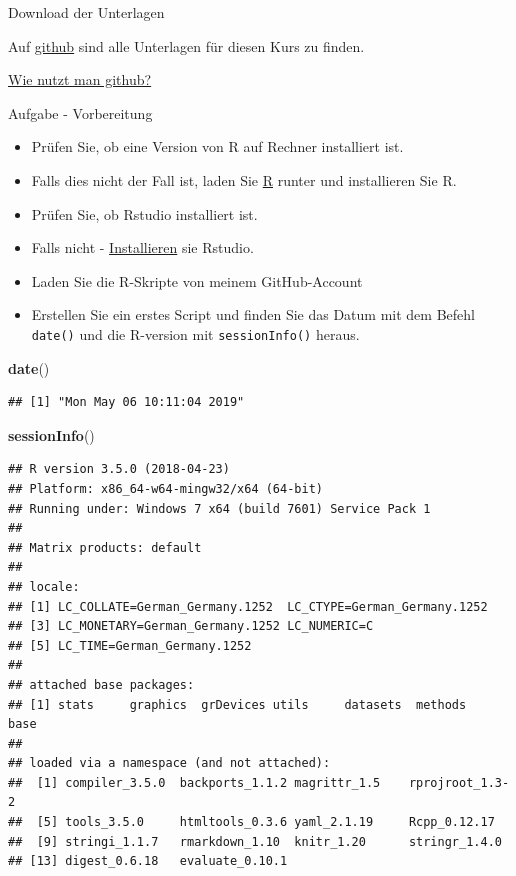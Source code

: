 \documentclass[
  ignorenonframetext,
]{beamer}
\newenvironment{Shaded}{\begin{snugshade}}{\end{snugshade}}
\newcommand{\KeywordTok}[1]{\textcolor[rgb]{0.26,0.66,0.93}{\textbf{#1}}}
\newcommand{\NormalTok}[1]{\textcolor[rgb]{0.74,0.68,0.62}{#1}}
\providecommand{\tightlist}{%
  \setlength{\itemsep}{0pt}\setlength{\parskip}{0pt}}
\begin{document}
\begin{frame}{Download der Unterlagen}
\protect\hypertarget{download-der-unterlagen}{}

Auf \href{https://github.com/Japhilko/IntroR/tree/master/2017}{github}
sind alle Unterlagen für diesen Kurs zu finden.

\href{https://guides.github.com/activities/hello-world/}{Wie nutzt man
github?}

\end{frame}

\begin{frame}[fragile]{Aufgabe - Vorbereitung}
\protect\hypertarget{aufgabe---vorbereitung}{}

\begin{itemize}
\tightlist
\item
  Prüfen Sie, ob eine Version von R auf Rechner installiert ist.
\item
  Falls dies nicht der Fall ist, laden Sie \href{r-project.org}{R}
  runter und installieren Sie R.
\item
  Prüfen Sie, ob Rstudio installiert ist.
\item
  Falls nicht - \href{http://www.rstudio.com/}{Installieren} sie
  Rstudio.
\item
  Laden Sie die R-Skripte von meinem GitHub-Account
\item
  Erstellen Sie ein erstes Script und finden Sie das Datum mit dem
  Befehl \texttt{date()} und die R-version mit \texttt{sessionInfo()}
  heraus.
\end{itemize}

\begin{Shaded}
\begin{Highlighting}[]
\KeywordTok{date}\NormalTok{()}
\end{Highlighting}
\end{Shaded}

\begin{verbatim}
## [1] "Mon May 06 10:11:04 2019"
\end{verbatim}

\begin{Shaded}
\begin{Highlighting}[]
\KeywordTok{sessionInfo}\NormalTok{()}
\end{Highlighting}
\end{Shaded}

\begin{verbatim}
## R version 3.5.0 (2018-04-23)
## Platform: x86_64-w64-mingw32/x64 (64-bit)
## Running under: Windows 7 x64 (build 7601) Service Pack 1
## 
## Matrix products: default
## 
## locale:
## [1] LC_COLLATE=German_Germany.1252  LC_CTYPE=German_Germany.1252   
## [3] LC_MONETARY=German_Germany.1252 LC_NUMERIC=C                   
## [5] LC_TIME=German_Germany.1252    
## 
## attached base packages:
## [1] stats     graphics  grDevices utils     datasets  methods   base     
## 
## loaded via a namespace (and not attached):
##  [1] compiler_3.5.0  backports_1.1.2 magrittr_1.5    rprojroot_1.3-2
##  [5] tools_3.5.0     htmltools_0.3.6 yaml_2.1.19     Rcpp_0.12.17   
##  [9] stringi_1.1.7   rmarkdown_1.10  knitr_1.20      stringr_1.4.0  
## [13] digest_0.6.18   evaluate_0.10.1
\end{verbatim}


\end{frame}
\end{document}

